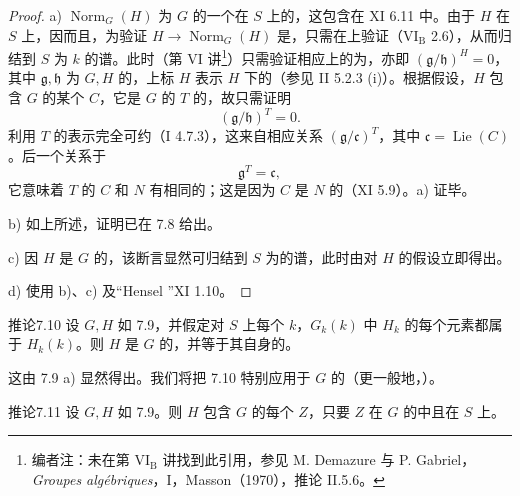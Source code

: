 \begin{proof}
a) $\operatorname{Norm}_G(H)$ 为 $G$ 的一个在 $S$ 上的，这包含在 XI 6.11 中。由于 $H$ 在 $S$ 上，因而且，为验证 $H\to\operatorname{Norm}_G(H)$ 是，只需在上验证（VI$_{\mathrm B}$ 2.6），从而归结到 $S$ 为 $k$ 的谱。此时（第 VI 讲\footnote{编者注：未在第 VI$_{\mathrm B}$ 讲找到此引用，参见 M. Demazure 与 P. Gabriel，\textit{Groupes algébriques}，I，Masson（1970），推论 II.5.6。}）只需验证相应上的为，亦即 $(\mathfrak g/\mathfrak h)^H=0$，其中 $\mathfrak g,\mathfrak h$ 为 $G,H$ 的，上标 $H$ 表示 $H$ 下的（参见 II 5.2.3 (i)）。根据假设，$H$ 包含 $G$ 的某个 $C$，它是 $G$ 的 $T$ 的，故只需证明
\[
(\mathfrak g/\mathfrak h)^T=0.
\]
利用 $T$ 的表示完全可约（I 4.7.3），这来自相应关系 $(\mathfrak g/\mathfrak c)^T$，其中 $\mathfrak c=\operatorname{Lie}(C)$。后一个关系于
\[
\mathfrak g^T=\mathfrak c,
\]
它意味着 $T$ 的 $C$ 和 $N$ 有相同的；这是因为 $C$ 是 $N$ 的（XI 5.9）。a) 证毕。

b) 如上所述，证明已在 7.8 给出。

c) 因 $H$ 是 $G$ 的，该断言显然可归结到 $S$ 为的谱，此时由对 $H$ 的假设立即得出。

d) 使用 b)、c) 及“Hensel ”XI 1.10。
\end{proof}
\begin{SGAresult}{推论}{7.10}
设 $G,H$ 如 7.9，并假定对 $S$ 上每个 $k$，$G_k(k)$ 中 $H_k$ 的每个元素都属于 $H_k(k)$。则 $H$ 是 $G$ 的，并等于其自身的。
\end{SGAresult}
这由 7.9 a) 显然得出。我们将把 7.10 特别应用于 $G$ 的（更一般地，）。
\begin{SGAresult}{推论}{7.11}
设 $G,H$ 如 7.9。则 $H$ 包含 $G$ 的每个 $Z$，只要 $Z$ 在 $G$ 的中且在 $S$ 上。
\end{SGAresult}
